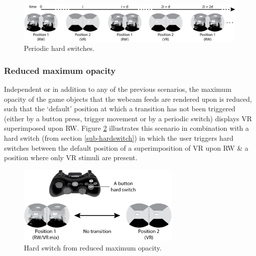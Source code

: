 \begin{figure}[h]
	\begin{center}
		\includegraphics[width=\textwidth]{images/timed-switch.png}
		\caption{Periodic hard switches.}
		\label{scenariotimed}
	\end{center}
\end{figure}


\newpage

\subsubsection{Reduced maximum opacity}
\label{subsub-baseopacity}
Independent or in addition to any of the previous scenarios, the maximum opacity of the game objects that the webcam feeds are rendered upon is reduced, such that the `default' position at which a transition has not been triggered (either by a button press, trigger movement or by a periodic switch) displays VR superimposed upon RW. Figure \ref{scenariobaseopacity} illustrates this scenario in combination with a hard switch (from section \ref{sub-hardswitch}) in which the user triggers hard switches between the default position of a superimposition of VR upon RW \& a position where only VR stimuli are present.

\begin{figure}[h]
	\begin{center}
		\includegraphics[width=0.7\textwidth]{images/base-opacity-hard-switch.png}
		\caption{Hard switch from reduced maximum opacity.}
		\label{scenariobaseopacity}
	\end{center}
\end{figure}


